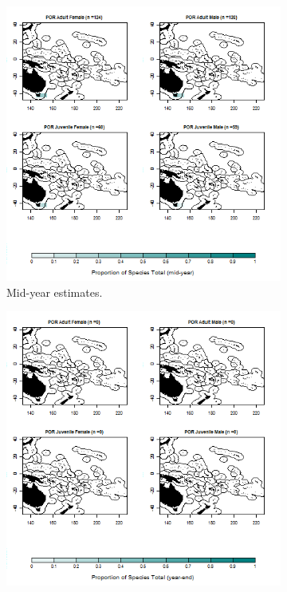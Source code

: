\documentclass[12pt]{SCreport}
\begin{document}
\begin{landscape}
\begin{figure}
\centering
   \begin{subfigure}[b]{0.6\textwidth}
       \includegraphics[width=\textwidth]{../GRAPHICS/Defined/BI_30_Map_maturity_sex_POR_MY}
       \caption{Mid-year estimates.}
       \label{fig:BI_30}
   \end{subfigure}
   \begin{subfigure}[b]{0.6\textwidth}
       \includegraphics[width=\textwidth]{../GRAPHICS/Defined/BI_29_Map_maturity_sex_POR}

\end{subfigure}
\end{figure}
\end{landscape}
\end{document}
